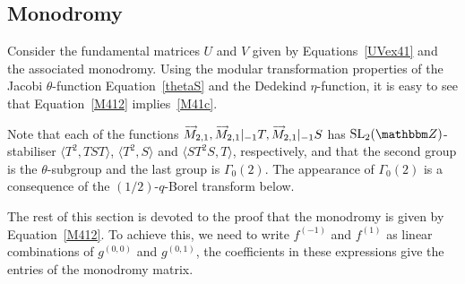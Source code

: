 \documentclass[12pt,reqno]{amsart}
\theoremstyle{definition}
\def\BZ{\mathbbm Z}
\def\SL{\mathrm{SL}}
\def\vM{\accentset{\longrightarrow}{M}}
\begin{document}
\subsection{Monodromy}

Consider the fundamental matrices $U$ and $V$ given by Equations~\eqref{UVex41}
and the associated monodromy. Using the modular transformation properties of
the Jacobi $\theta$-function Equation~\eqref{thetaS} and the Dedekind $\eta$-function,
it is easy to see that Equation~\eqref{M412} implies~\eqref{M41c}.

Note that each of the functions $\vM_{2,1},\vM_{2,1}|_{-1}T,\vM_{2,1}|_{-1}S$ has
$\SL_2(\BZ)$-stabiliser $\langle T^2,TST\rangle$, $\langle T^2,S\rangle$ and
$\langle ST^2S,T\rangle$, respectively, and that the second group is the
$\theta$-subgroup and the last group is $\Gamma_{0}(2)$. The appearance of
$\Gamma_{0}(2)$ is a consequence of the $(1/2)$-$q$-Borel transform below. 

The rest of this section is devoted to the proof that the monodromy is given
by Equation~\eqref{M412}. To achieve this, we need to write $f^{(-1)}$ and $f^{(1)}$
as linear combinations of $g^{(0,0)}$ and $g^{(0,1)}$, the coefficients in these
expressions give the entries of the monodromy matrix. 
\end{document}
